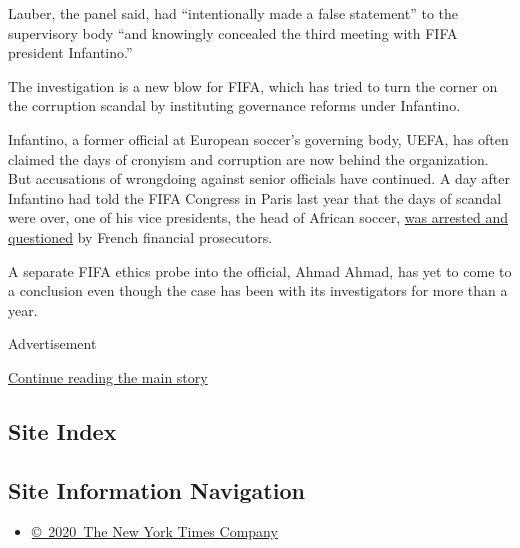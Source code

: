 Lauber, the panel said, had ``intentionally made a false statement'' to
the supervisory body ``and knowingly concealed the third meeting with
FIFA president Infantino.''

The investigation is a new blow for FIFA, which has tried to turn the
corner on the corruption scandal by instituting governance reforms under
Infantino.

Infantino, a former official at European soccer's governing body, UEFA,
has often claimed the days of cronyism and corruption are now behind the
organization. But accusations of wrongdoing against senior officials
have continued. A day after Infantino had told the FIFA Congress in
Paris last year that the days of scandal were over, one of his vice
presidents, the head of African soccer,
\href{https://www.nytimes.com/2019/06/06/sports/fifa-ahmad-ahmad.html}{was
arrested and questioned} by French financial prosecutors.

A separate FIFA ethics probe into the official, Ahmad Ahmad, has yet to
come to a conclusion even though the case has been with its
investigators for more than a year.

Advertisement

\protect\hyperlink{after-bottom}{Continue reading the main story}

\hypertarget{site-index}{%
\subsection{Site Index}\label{site-index}}

\hypertarget{site-information-navigation}{%
\subsection{Site Information
Navigation}\label{site-information-navigation}}

\begin{itemize}
\tightlist
\item
  \href{https://help.nytimes.com/hc/en-us/articles/115014792127-Copyright-notice}{©~2020~The
  New York Times Company}
\end{itemize}

